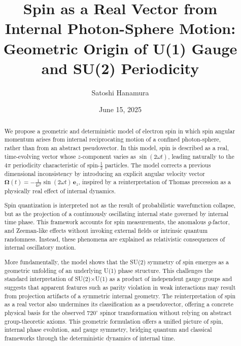 \documentclass[%
 reprint,
 amsmath,amssymb,
 aps,
]{revtex4-1}
\numberwithin{equation}{section}%
\begin{document}


\title{Spin as a Real Vector from Internal Photon-Sphere Motion:\\ Geometric Origin of U(1) Gauge and SU(2) Periodicity}
\author{Satoshi Hanamura}
\date{June 15, 2025}


\begin{abstract}
We propose a geometric and deterministic model of electron spin in which spin angular momentum arises from internal reciprocating motion of a confined photon-sphere, rather than from an abstract pseudovector. In this model, spin is described as a real, time-evolving vector whose $z$-component varies as $\sin(2\omega t)$, leading naturally to the $4\pi$ periodicity characteristic of spin-$\frac{1}{2}$ particles. The model corrects a previous dimensional inconsistency by introducing an explicit angular velocity vector $\boldsymbol{\Omega}(t) = -\frac{1}{4c^2} \sin(2\omega t)\,\mathbf{e}_z$, inspired by a reinterpretation of Thomas precession as a physically real effect of internal dynamics.

Spin quantization is interpreted not as the result of probabilistic wavefunction collapse, but as the projection of a continuously oscillating internal state governed by internal time phase. This framework accounts for spin measurements, the anomalous $g$-factor, and Zeeman-like effects without invoking external fields or intrinsic quantum randomness. Instead, these phenomena are explained as relativistic consequences of internal oscillatory motion.

More fundamentally, the model shows that the SU(2) symmetry of spin emerges as a geometric unfolding of an underlying U(1) phase structure. This challenges the standard interpretation of SU(2)$\times$U(1) as a product of independent gauge groups and suggests that apparent features such as parity violation in weak interactions may result from projection artifacts of a symmetric internal geometry. The reinterpretation of spin as a real vector also undermines its classification as a pseudovector, offering a concrete physical basis for the observed $720^\circ$ spinor transformation without relying on abstract group-theoretic axioms. This geometric formulation offers a unified picture of spin, internal phase evolution, and gauge symmetry, bridging quantum and classical frameworks through the deterministic dynamics of internal time.
\end{abstract}
\end{document}
